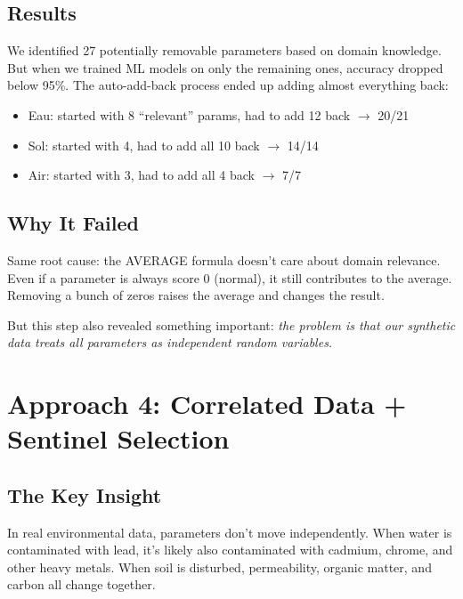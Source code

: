 \documentclass[12pt,a4paper]{article}
\begin{document}
\subsection{Results}

We identified 27 potentially removable parameters based on domain knowledge. But when we trained ML models on only the remaining ones, accuracy dropped below 95\%. The auto-add-back process ended up adding almost everything back:

\begin{itemize}
    \item Eau: started with 8 ``relevant'' params, had to add 12 back $\rightarrow$ 20/21
    \item Sol: started with 4, had to add all 10 back $\rightarrow$ 14/14
    \item Air: started with 3, had to add all 4 back $\rightarrow$ 7/7
\end{itemize}

\subsection{Why It Failed}

Same root cause: the AVERAGE formula doesn't care about domain relevance. Even if a parameter is always score 0 (normal), it still contributes to the average. Removing a bunch of zeros raises the average and changes the result.

But this step also revealed something important: \textit{the problem is that our synthetic data treats all parameters as independent random variables.}

\section{Approach 4: Correlated Data + Sentinel Selection}
\label{sec:final}

\subsection{The Key Insight}

In real environmental data, parameters don't move independently. When water is contaminated with lead, it's likely also contaminated with cadmium, chrome, and other heavy metals. When soil is disturbed, permeability, organic matter, and carbon all change together.
\end{document}
